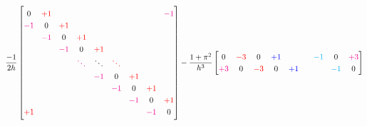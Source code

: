 \begin{equation*}
\renewcommand{\arraystretch}{1.25} %
\renewcommand{\arraycolsep}{4.7pt} %
\frac{-1}{2h}
\begin{bmatrix}
0           & \ca +1   &             &             &             &             &             &             & \cb -1      \\
\cb -1      & 0        & \ca +1      &             &             &             &             &             &             \\
            & \cb -1   & 0           & \ca +1      &             &             &             &             &             \\
            &          & \cb -1      & 0           & \ca +1      &             &             &             &             \\
            &          &             & \cb \ddots  & \ddots      & \ca \ddots  &             &             &             \\
            &          &             &             & \cb -1      & 0           & \ca +1      &             &             \\
            &          &             &             &             & \cb -1      & 0           & \ca +1      &             \\
            &          &             &             &             &             & \cb -1      & 0           & \ca +1      \\
\ca +1      &          &             &             &             &             &             & \cb -1      & 0           \\
\end{bmatrix}
-\frac{1+\pi^2}{h^3}
\begin{bmatrix}
0           & \ca -3      & 0           & \cc +1      &             &             & \cd -1      & 0           & \cb +3      \\
\cb +3      & 0           & \ca -3      & 0           & \cc +1      &             &             & \cd -1      & 0           \\

\end{bmatrix}
\end{equation*}
